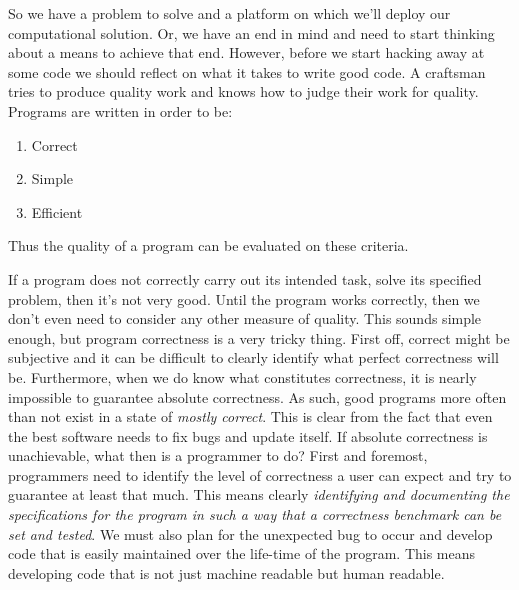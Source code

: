 \documentclass[]{tufte-handout}
\begin{document}
So we have a problem to solve and a platform on which we'll deploy our computational solution. Or, we have an end in mind and need to start thinking about a means to achieve that end.  However, before we start hacking away at some code we should reflect on what it takes to write good code. A craftsman tries to produce quality work and knows how to judge their work for quality. Programs are written in order to be:
\begin{enumerate}
\item Correct 
\item Simple
\item Efficient
\end{enumerate}
Thus the quality of a program can be evaluated on these criteria. 

If a program does not correctly carry out its intended task, solve its specified problem, then it's not very good. Until the program works correctly, then we don't even need to consider any other measure of quality.  This sounds simple enough, but program correctness is a very tricky thing.  First off, correct might be subjective and it can be difficult to clearly identify what perfect correctness will be.  Furthermore, when we do know what constitutes correctness, it is nearly impossible to guarantee absolute correctness.  As such, good programs more often than not exist in a state of \textit{mostly correct}.  This is clear from the fact that even the best software needs to fix bugs and update itself. If absolute correctness is unachievable, what then is a programmer to do? First and foremost, programmers need to identify the level of correctness a user can expect and try to guarantee at least that much. This means clearly \textit{identifying and documenting the specifications for the program in such a way that a correctness benchmark can be set and \textit{tested}}.  We must also plan for the unexpected bug to occur and develop code that is easily maintained over the life-time of the program.  This means developing code that is not just machine readable but human readable.  
\end{document}
